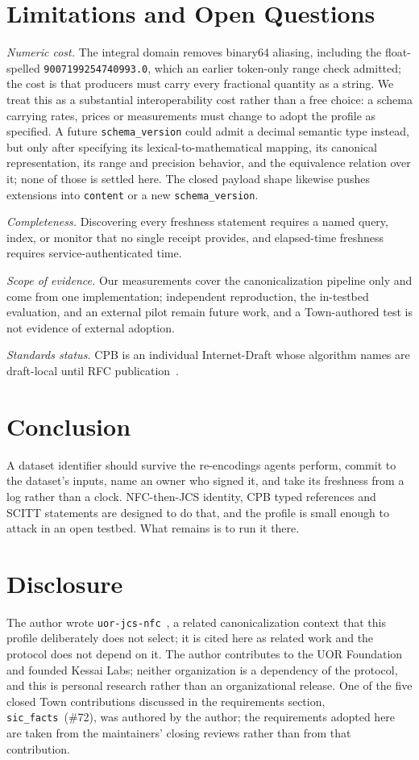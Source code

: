 \documentclass[conference]{IEEEtran}
\begin{document}
\section{Limitations and Open Questions}
\emph{Numeric cost.} The integral domain removes binary64 aliasing, including the float-spelled \texttt{9007199254740993.0}, which an earlier token-only range check admitted; the cost is that producers must carry every fractional quantity as a string. We treat this as a substantial interoperability cost rather than a free choice: a schema carrying rates, prices or measurements must change to adopt the profile as specified. A future \texttt{schema\_version} could admit a decimal semantic type instead, but only after specifying its lexical-to-mathematical mapping, its canonical representation, its range and precision behavior, and the equivalence relation over it; none of those is settled here. The closed payload shape likewise pushes extensions into \texttt{content} or a new \texttt{schema\_version}.

\emph{Completeness.} Discovering every freshness statement requires a named query, index, or monitor that no single receipt provides, and elapsed-time freshness requires service-authenticated time.

\emph{Scope of evidence.} Our measurements cover the canonicalization pipeline only and come from one implementation; independent reproduction, the in-testbed evaluation, and an external pilot remain future work, and a Town-authored test is not evidence of external adoption.

\emph{Standards status.} CPB is an individual Internet-Draft whose algorithm names are draft-local until RFC publication~\cite{cpb03}.

\section{Conclusion}
A dataset identifier should survive the re-encodings agents perform, commit to the dataset's inputs, name an owner who signed it, and take its freshness from a log rather than a clock. NFC-then-JCS identity, CPB typed references and SCITT statements are designed to do that, and the profile is small enough to attack in an open testbed. What remains is to run it there.

\section*{Disclosure}
The author wrote \texttt{uor-jcs-nfc}~\cite{uorjcsnfc}, a related canonicalization context that this profile deliberately does not select; it is cited here as related work and the protocol does not depend on it. The author contributes to the UOR Foundation and founded Kessai Labs; neither organization is a dependency of the protocol, and this is personal research rather than an organizational release. One of the five closed Town contributions discussed in the requirements section, \texttt{sic\_facts}~(\#72), was authored by the author; the requirements adopted here are taken from the maintainers' closing reviews rather than from that contribution.
\end{document}
